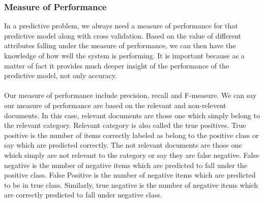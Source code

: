 \subsubsection{Measure of Performance}
In a predictive problem, we always need a measure of performance for that predictive model along with cross validation. Based on the value of different attributes falling under 
the measure of performance, we can then have the knowledge of how well the system is performing. It is important because as a matter of fact it provides much deeper insight of the performance of
the predictive model, not only accuracy.\\
\\
Our measure of performance include precision, recall and F-measure. We can say our measure of performance are based on the relevant and non-relevent documents. In this case,
relevant documents are those one which simply belong to the relevant category. Relevant category is also called the true positives. True positive is the number of items correctly
labeled as belong to the positive class or say which are predicted correctly. The not relevant documents are those one which simply are not relevant to the category or say they are false negative. 
False negative is the number of negative items which are predicted to fall under the positive class. False Positive is the number of negative items which are predicted to be in true class.
Similarly, true negative is the number of negative items which are correctly predicted to fall under negative class.

